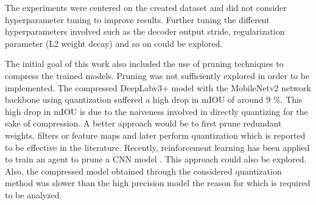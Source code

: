The experiments were centered on the created dataset and did not consider hyperparameter tuning to improve results. Further tuning the different hyperparameters involved such as the decoder output stride, regularization parameter (L2 weight decay) and so on could be explored. 

The initial goal of this work also included the use of pruning techniques to compress the trained models. Pruning was not sufficiently explored in order to be implemented. The compressed DeepLabv3+ model with the MobileNetv2 network backbone using quantization suffered a high drop in mIOU of around 9 \%. This high drop in mIOU is due to the naiveness involved in directly quantizing for the sake of compression. A better approach would be to first prune redundant weights, filters or feature maps and later perform quantization which is reported to be effective in the literature. Recently, reinforcement learning has been applied to train an agent to prune a CNN model \cite{DBLP:journals/corr/abs-1801-07365}. This approach could also be explored. Also, the compressed model obtained through the considered quantization method was slower than the high precision model the reason for which is required to be analyzed.

